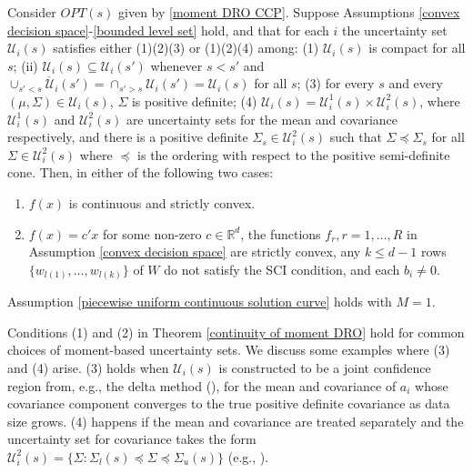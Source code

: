 \documentclass[mnsc,blindrev]{informs4} %
\newcommand{\R}{\mathbb{R}}
\begin{document}
\begin{theorem}\label{continuity of moment DRO}
Consider $OPT(s)$ given by \eqref{moment DRO CCP}. Suppose Assumptions \ref{convex decision space}-\ref{bounded level set} hold, and that for each $i$ the uncertainty set $\mathcal U_i(s)$ satisfies either (1)(2)(3) or (1)(2)(4) among: (1) $\mathcal U_i(s)$ is compact for all $s$; (ii) $\mathcal U_i(s)\subseteq \mathcal U_i(s')$ whenever $s< s'$ and $\overline{\cup_{s'<s}\mathcal U_i(s')}=\cap_{s'>s}\mathcal U_i(s')=\mathcal U_i(s)$ for all $s$; (3) for every $s$ and every $(\mu,\Sigma)\in \mathcal U_i(s)$, $\Sigma$ is positive definite; (4) $\mathcal U_i(s)=\mathcal U^1_i(s)\times \mathcal U^2_i(s)$, where $\mathcal U^1_i(s)$ and $\mathcal U^2_i(s)$ are uncertainty sets for the mean and covariance respectively, and there is a positive definite $\Sigma_s\in \mathcal U^2_i(s)$ such that $\Sigma\preceq\Sigma_s$ for all $\Sigma\in \mathcal U^2_i(s)$ where $\preceq$ is the ordering with respect to the positive semi-definite cone. Then, in either of the following two cases:
\begin{enumerate}
\item[i.]$f(x)$ is continuous and strictly convex.
\item[ii.]$f(x)=c'x$ for some non-zero $c\in\R^d$, the functions $f_r,r=1,\ldots,R$ in Assumption \ref{convex decision space} are strictly convex, any $k\leq d-1$ rows $\{w_{l(1)},\ldots,w_{l(k)}\}$ of $W$ do not satisfy the SCI condition, and each $b_i\neq 0$.
\end{enumerate}
Assumption \ref{piecewise uniform continuous solution curve} holds with $M=1$.
\end{theorem}
Conditions (1) and (2) in Theorem \ref{continuity of moment DRO} hold for common choices of moment-based uncertainty sets. We discuss some examples where (3) and (4) arise. (3) holds when $\mathcal U_i(s)$ is constructed to be a joint confidence region from, e.g., the delta method (\cite{marandi2019extending}), for the mean and covariance of $a_i$ whose covariance component converges to the true positive definite covariance as data size grows. (4) happens if the mean and covariance are treated separately and the uncertainty set for covariance takes the form $\mathcal U^2_i(s)=\{\Sigma:\Sigma_l(s)\preceq \Sigma\preceq\Sigma_u(s)\}$ (e.g., \cite{delage2010distributionally}).

\smallskip
\end{document}
